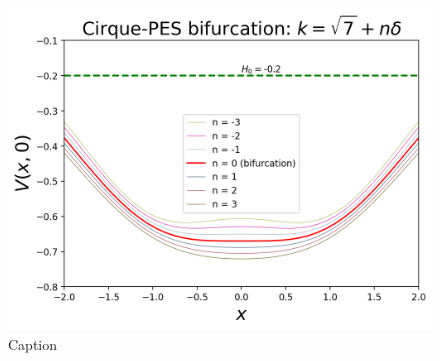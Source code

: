 \documentclass[10pt,aps,onecolumn,superscriptaddress]{revtex4-2}
\begin{document}
\begin{figure}
    \centering
    \includegraphics{pes_profile_around_bifurcation.png}
    \caption{Caption}
\end{figure}
\end{document}

